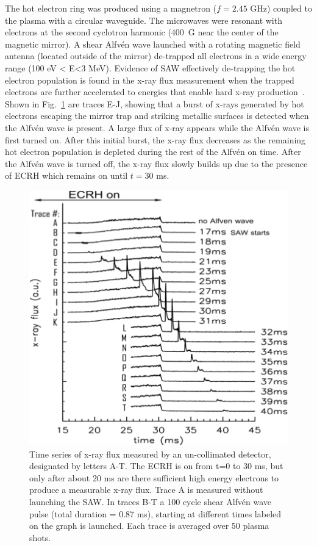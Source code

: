 \documentclass[11pt]{article}
\newcommand\Alfven{Alfv\'en }
\renewcommand{\cite}{\citep}
\begin{document}
The hot electron ring was produced using a magnetron ($f=2.45$ GHz)
coupled to the plasma with a circular waveguide. The microwaves were
resonant with electrons at the second cyclotron harmonic (400~G  near
the center of the magnetic mirror). A shear Alfv\'{e}n wave launched with a
rotating magnetic field antenna (located outside of the mirror)
de-trapped all electrons in a wide energy range (100 eV \textless{}
E\textless{}3 MeV). Evidence of SAW effectively de-trapping the hot
electron population is found in the x-ray flux measurement when the
trapped electrons are further accelerated to energies that enable hard
x-ray production~\cite{wang:2012}. Shown in Fig.~\ref{muri1} are
traces E-J, showing  that a burst of x-rays
generated by hot electrons escaping the mirror trap and striking
metallic surfaces  is detected when the \Alfven wave is present. A
large flux of x-ray appears while the Alfv\'{e}n wave is first turned on.
After this initial burst, the x-ray flux decreases as the remaining hot
electron population is depleted during the rest of the Alfv\'{e}n on time.
After the Alfv\'{e}n wave is turned off, the x-ray flux slowly builds up due
to the presence of ECRH which remains on until $t = 30$ ms.

\begin{figure}[!htbp]
\centerline{\includegraphics[width=3.5truein]{muri1}}
\caption{Time series of x-ray flux
measured by an un-collimated detector, designated by letters A-T. The
ECRH is on from t=0 to 30 ms, but only after about 20 ms are there
sufficient high energy electrons to produce a measurable x-ray flux.
Trace A is measured without launching the SAW. In traces B-T a 100 cycle
shear Alfvén wave pulse (total duration = 0.87 ms), starting at
different times labeled on the graph is launched. Each trace is averaged
over 50 plasma shots.}\label{muri1}
\end{figure}
\end{document}
